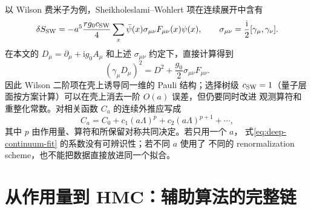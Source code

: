 \documentclass[UTF8,11pt,oneside]{ctexbook}
\begin{document}
以 Wilson 费米子为例，Sheikholeslami--Wohlert 项在连续展开中含有
\begin{equation}
 \delta S_{\rm SW}
 =-a^5\frac{r g_0c_{\rm SW}}4\sum_x\bar\psi(x)
 \sigma_{\mu\nu}F_{\mu\nu}(x)\psi(x),
 \qquad
 \sigma_{\mu\nu}=\frac{\mathrm{i}}2[\gamma_\mu,\gamma_\nu].
 \label{eq:deep-clover-improvement}
\end{equation}
在本文的 \(D_\mu=\partial_\mu+\mathrm{i}g_0A_\mu\) 和上述
\(\sigma_{\mu\nu}\) 约定下，直接计算得到
\begin{equation}
 (\gamma_\mu D_\mu)^2=D^2+\frac{g_0}{2}\sigma_{\mu\nu}F_{\mu\nu}.
 \label{eq:deep-dirac-square}
\end{equation}
因此 Wilson 二阶项在壳上诱导同一维的 Pauli 结构；选择树级
\(c_{\rm SW}=1\)（量子层面按方案计算）可以在壳上消去一阶 \(O(a)\) 误差，但仍要同时改进
观测算符和重整化常数。对相关函数 \(C_a\) 的连续外推应写成
\begin{equation}
 C_a=C_0+c_1(a\Lambda)^p+c_2(a\Lambda)^{p+1}+\cdots,
 \label{eq:deep-continuum-fit}
\end{equation}
其中 \(p\) 由作用量、算符和所保留对称共同决定。若只用一个 \(a\)，
式\eqref{eq:deep-continuum-fit} 的系数没有可辨识性；若不同 \(a\) 使用了
不同的 renormalization scheme，也不能把数据直接放进同一个拟合。

\section{从作用量到 HMC：辅助算法的完整链}
\end{document}
